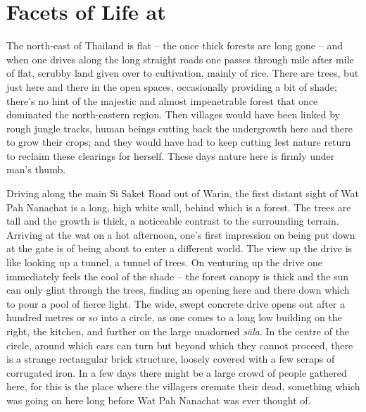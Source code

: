 
\chapter[Facets of Life at Wat Pah Nanachat]{Facets of Life at\newline {}}
\markright{\theChapterAuthor}

The north-east of Thailand is flat -- the once thick forests are long
gone -- and when one drives along the long straight roads one passes
through mile after mile of flat, scrubby land given over to cultivation, 
mainly of rice. There are trees, but just here and there in the open
spaces, occasionally providing a bit of shade; there's no hint of the
majestic and almost impenetrable forest that once dominated the
north-eastern region. Then villages would have been linked by rough
jungle tracks, human beings cutting back the undergrowth here and there
to grow their crops; and they would have had to keep cutting lest nature
return to reclaim these clearings for herself. These days nature here is
firmly under man's thumb. 

Driving along the main Si Saket Road out of Warin, the first distant
sight of Wat Pah Nanachat is a long, high white wall, behind which is a
forest. The trees are tall and the growth is thick, a noticeable
contrast to the surrounding terrain. Arriving at the wat on a hot
afternoon, one's first impression on being put down at the gate is of
being about to enter a different world. The view up the drive is like
looking up a tunnel, a tunnel of trees. On venturing up the drive one
immediately feels the cool of the shade -- the forest canopy is thick
and the sun can only glint through the trees, finding an opening here
and there down which to pour a pool of fierce light. The wide, swept
concrete drive opens out after a hundred metres or so into a circle, as
one comes to a long low building on the right, the kitchen, and further
on the large unadorned \emph{sāla}. In the centre of the circle, around
which cars can turn but beyond which they cannot proceed, there is a
strange rectangular brick structure, loosely covered with a few scraps
of corrugated iron. In a few days there might be a large crowd of people
gathered here, for this is the place where the villagers cremate their
dead, something which was going on here long before Wat Pah Nanachat was
ever thought of. 

